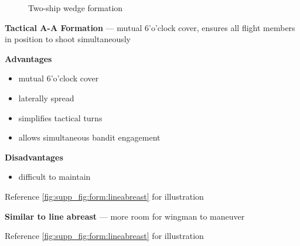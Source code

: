 \begin{figure}[htbp]
\begin{minipage}[b]{0.5\textwidth}
        \caption{Two-ship wedge formation}
        \label{fig:supp_fig:form:wedge}
    \end{minipage}
\end{figure}

\begin{tcoloritemize}
    \textbf{Tactical A-A Formation} --- mutual 6'o'clock cover, ensures all flight members in position to shoot simultaneously
    \medskip

    \textbf{Advantages}
    \begin{itemize}
        \item mutual 6'o'clock cover
        \item laterally spread
        \item simplifies tactical turns
        \item allows simultaneous bandit engagement
    \end{itemize}

    \textbf{Disadvantages}
    \begin{itemize}
        \item difficult to maintain
    \end{itemize}

    Reference \cref{fig:supp_fig:form:lineabreast} for illustration

    \blueitem[Spread]
    \textbf{Similar to line abreast} --- more room for wingman to maneuver

    Reference \cref{fig:supp_fig:form:lineabreast} for illustration
\end{tcoloritemize}



